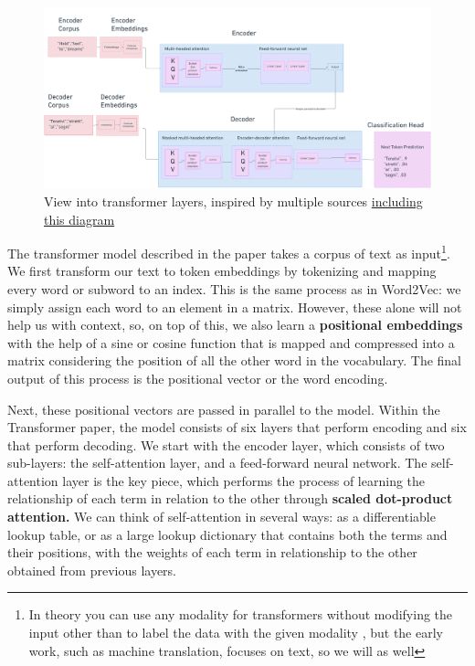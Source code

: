 \documentclass[11pt, table]{diazessay} %
\begin{document}
\begin{sloppypar}
\begin{figure}[H]
\centering
\includegraphics[width=.9\textwidth]{figures/transformer_v.png}
\caption{View into transformer layers, inspired by multiple sources \href{https://lilianweng.github.io/posts/2018-06-24-attention/}{including this diagram } }
\end{figure}

The transformer model described in the paper takes a corpus of text as input\footnote{In theory you can use any modality for transformers without modifying the input other than to label the data with the given modality \citep{xu2023multimodal}, but the early work, such as machine translation, focuses on text, so we will as well}. We first transform our text to token embeddings by tokenizing and mapping every word or subword to an index. This is the same process as in Word2Vec: we simply assign each word to an element in a matrix. However, these alone will not help us with context, so, on top of this, we also learn a \textbf{positional embeddings} with the help of a sine or cosine function that is mapped and compressed into a matrix considering the position of all the other word in the vocabulary. The final output of this process is the positional vector or the word encoding.

Next, these positional vectors are passed in parallel to the model. Within the Transformer paper, the model consists of six layers that perform encoding and six that perform decoding. We start with the encoder layer, which consists of two sub-layers: the self-attention layer, and a feed-forward neural network. The self-attention layer is the key piece, which performs the process of learning the relationship of each term in relation to the other through \textbf{scaled dot-product attention.} We can think of self-attention in several ways: as a differentiable lookup table, or as a large lookup dictionary that contains both the terms and their positions, with the weights of each term in relationship to the other obtained from previous layers.


\end{sloppypar}
\end{document}
